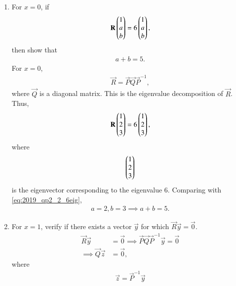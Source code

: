 \documentclass[journal,12pt,twocolumn]{IEEEtran}
\renewcommand\thesection{\arabic{section}}
\begin{document}
\begin{enumerate}[label=\thesection.\arabic*
,ref=\thesection.\theenumi]
%
Thus, 
\begin{multline}
\det(\vec{R}) - \det\myvec{2 & x & x \\ 0 & 4 & 0 \\ x & x & 5}
\\
= 4\cbrak{\brak{12-x^2}-\brak{10-x^2}}
\\
= 8
\end{multline}
%
which is true.
\item For $x= 0$, if 
\begin{align}
\label{eq:2019_qp2_2_ab}
\mathbf{R}\begin{pmatrix}1 \\ a \\ b\end{pmatrix} = 6\begin{pmatrix}1 \\ a \\ b\end{pmatrix}, 
\end{align}
%
then show that 
\begin{align}
a+b = 5.
\end{align}
\solution For $x=0$, 
\begin{align}
\vec{R} = \vec{P}\vec{Q}\vec{P}^{-1},
\end{align}
%
where $\vec{Q}$ is a diagonal matrix.  This is the eigenvalue decomposition of $\vec{R}$.  Thus, 
\begin{align}
\label{eq:2019_qp2_2_6eig}
\mathbf{R}\begin{pmatrix}1 \\ 2 \\ 3\end{pmatrix} = 6\begin{pmatrix}1 \\ 2 \\ 3\end{pmatrix}, 
\end{align}
%
where 
\begin{align}
\begin{pmatrix}1 \\ 2 \\ 3\end{pmatrix}
\end{align}
%
is the eigenvector corresponding to the eigenvalue $6$. Comparing with \eqref{eq:2019_qp2_2_6eig},
\begin{align}
a=2,b=3 \implies a+b = 5.
\end{align}
%
\item For $x = 1$, verify if  there exists a  vector $\vec{y}$ for which $\vec{R}\vec{y} = \vec{0}$. 
\\
\solution 
\begin{align}
\vec{R}\vec{y} &= \vec{0} \implies \vec{P}\vec{Q}\vec{P}^{-1}\vec{y} = \vec{0}
\nonumber \\
\implies \vec{Q} \vec{z}&= \vec{0},
\label{eq:2019_qp2_2_null}
\end{align}
%
where 
\begin{align}
\label{eq:2019_qp2_2_yz}
\vec{z} = \vec{P}^{-1}\vec{y} 

\end{align}
\end{enumerate}
\end{document}
